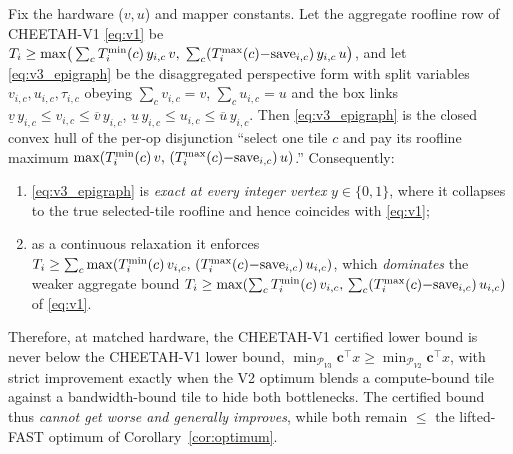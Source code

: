\begin{corollary}
\label{cor:v3_hull}
Fix the hardware ($v,u$) and mapper constants. Let the aggregate roofline row of
CHEETAH-V1 \eqref{eq:v1} be
$T_i \ge \max\!\big(\sum_c T^{\min}_i(c)\,y_{i,c}\,v,\; \sum_c (T^{\max}_i(c){-}\mathrm{save}_{i,c})\,y_{i,c}\,u\big)$,
and let \eqref{eq:v3_epigraph} be the disaggregated perspective form with split
variables $v_{i,c},u_{i,c},\tau_{i,c}$ obeying $\sum_c v_{i,c}{=}v$,
$\sum_c u_{i,c}{=}u$ and the box links
$\underline v\,y_{i,c}\le v_{i,c}\le \overline v\,y_{i,c}$,
$\underline u\,y_{i,c}\le u_{i,c}\le \overline u\,y_{i,c}$.
Then \eqref{eq:v3_epigraph} is the closed convex hull of the per-op disjunction
``select one tile $c$ and pay its roofline maximum
$\max(T^{\min}_i(c)\,v,\,(T^{\max}_i(c){-}\mathrm{save}_{i,c})\,u)$.'' Consequently:
\begin{enumerate}\setlength{\itemsep}{0pt}\setlength{\topsep}{0pt}
  \item[(i)] \eqref{eq:v3_epigraph} is \emph{exact at every integer vertex}
  $y\in\{0,1\}$, where it collapses to the true selected-tile roofline and hence
  coincides with \eqref{eq:v1};
  \item[(ii)] as a continuous relaxation it enforces
  $T_i \ge \sum_c \max(T^{\min}_i(c)\,v_{i,c},\,(T^{\max}_i(c){-}\mathrm{save}_{i,c})\,u_{i,c})$,
  which \emph{dominates} the weaker aggregate bound
  $T_i \ge \max(\sum_c T^{\min}_i(c)\,v_{i,c},\,\sum_c (T^{\max}_i(c){-}\mathrm{save}_{i,c})\,u_{i,c})$
  of \eqref{eq:v1}.
\end{enumerate}
Therefore, at matched hardware, the CHEETAH-V1 certified lower bound is never
below the CHEETAH-V1 lower bound,
$\min_{\mathcal{P}_{V3}}\mathbf{c}^\top x \ge \min_{\mathcal{P}_{V2}}\mathbf{c}^\top x$,
with strict improvement exactly when the V2 optimum blends a compute-bound tile
against a bandwidth-bound tile to hide both bottlenecks. The certified bound thus
\emph{cannot get worse and generally improves}, while both remain $\le$ the
lifted-FAST optimum of Corollary~\ref{cor:optimum}.
\end{corollary}
